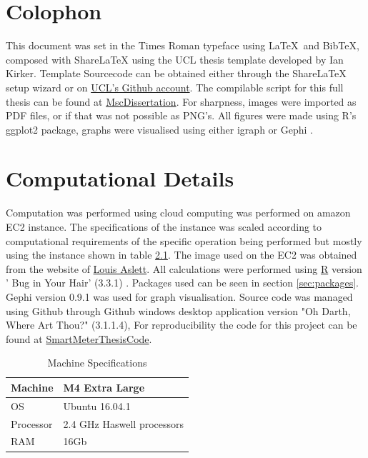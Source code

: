 \chapter{Colophon}
\label{appendixlabel3}
This document was set in the Times Roman typeface using \LaTeX\ and Bib\TeX , composed with ShareLaTeX using the UCL thesis template developed by Ian Kirker. Template Sourcecode can be obtained either through the ShareLaTeX setup wizard or on \href{https://github.com/UCL/ucl-latex-thesis-templates/blob/master/Main.tex}{UCL's Github account}.
The compilable script for this full thesis can be found at \href{https://github.com/JonnoB/MscDissertation}{MscDissertation}. For sharpness, images were imported as PDF files, or if that was not possible as PNG's. All figures were made using R's ggplot2 package, graphs were visualised using either igraph \cite{csrdi2006} or Gephi \cite{bastian2006}.


\chapter{Computational Details}
\label{TechComp}

Computation was performed using cloud computing was performed on amazon EC2 instance. 
The specifications of the instance was scaled according to computational requirements of the specific operation being performed but mostly using the instance shown in table \ref{tab:Machspec}. The image used on the EC2 was obtained from the website of \href{http://www.louisaslett.com/RStudio_AMI/}{Louis Aslett}. All calculations were performed using \href{https://www.r-project.org/}{R} version ' Bug in Your Hair' (3.3.1)  \cite{rcoreteam2016}. Packages used can be seen in section \ref{sec:packages}. Gephi version 0.9.1 was used for graph visualisation. Source code was managed using Github through Github windows desktop application version "Oh Darth, Where Art Thou?" (3.1.1.4), For reproducibility the code for this project can be found at \href{https://github.com/JonnoB/SmartMeterThesisCode}{SmartMeterThesisCode}.

\begin{table}[h]
\centering
\begin{tabular}{|l|l|}
\hline
Machine   & M4 Extra Large            \\ \hline
OS        & Ubuntu 16.04.1               \\ \hline
Processor & 2.4 GHz Haswell processors \\ \hline
RAM       & 16Gb                      \\ \hline
\end{tabular}
\caption{Machine Specifications}
\label{tab:Machspec}
\end{table}

